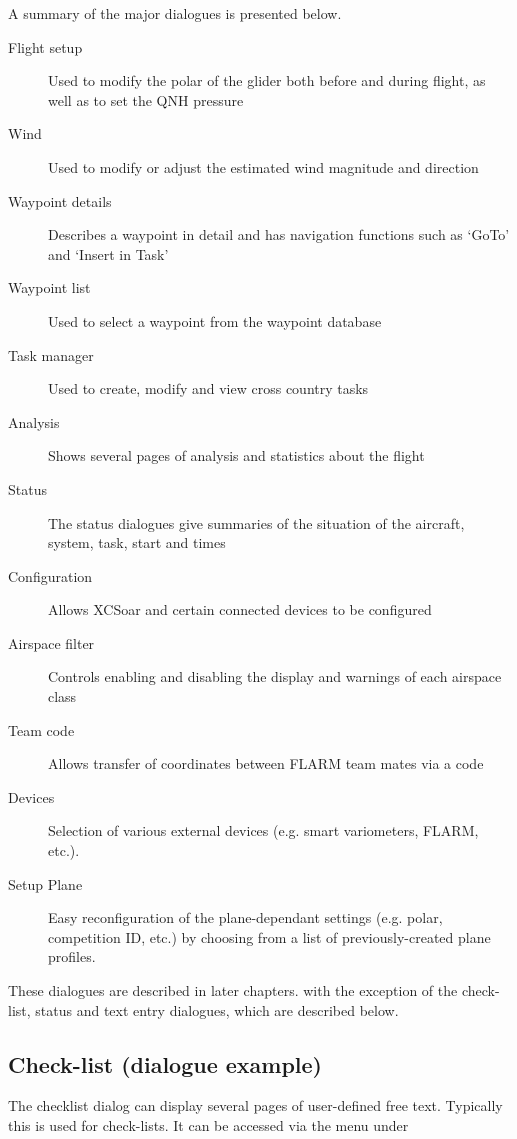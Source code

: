 A summary of the major dialogues is presented below.
\begin{description}
\item[Flight setup] Used to modify the polar of the glider both before and
during flight, as well as to set the QNH pressure
\item[Wind] Used to modify or adjust the estimated wind magnitude and direction
\item[Waypoint details] Describes a waypoint in detail and has navigation
functions such as `GoTo' and `Insert in Task'
\item[Waypoint list] Used to select a waypoint from the waypoint database
\item[Task manager] Used to create, modify and view cross country tasks
\item[Analysis] Shows several pages of analysis and statistics about the flight
\item[Status] The status dialogues give summaries of the situation of the 
aircraft, system, task, start and times
\item[Configuration] Allows XCSoar and certain connected devices to be
configured
\item[Airspace filter] Controls enabling and disabling the display and warnings
of each airspace class
\item[Team code] Allows transfer of coordinates between FLARM team mates via a code
\item[Devices]  Selection of various external devices (e.g. smart variometers, FLARM, etc.).
\item[Setup Plane]  Easy reconfiguration of the plane-dependant settings (e.g. polar, competition ID, etc.) by choosing from a list of previously-created plane profiles.
\end{description}

These dialogues are described in later chapters. with the exception of the
check-list, status and text entry dialogues, which are described below.

\subsection*{Check-list (dialogue example)}\label{sec:checklist}
The checklist dialog can display several pages of user-defined free text.
Typically this is used for check-lists. It can be accessed via the menu under 
\begin{quote}
\blink{}
\end{quote}

